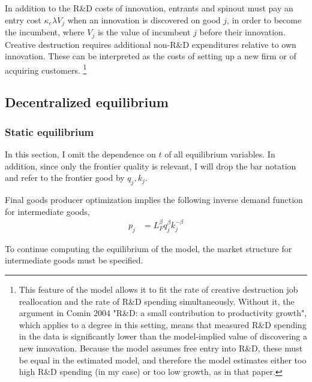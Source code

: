 \documentclass[11pt,english]{article}
\theoremstyle{remark}
\begin{document}
In addition to the R\&D costs of innovation, entrants and spinout must pay an entry cost $\kappa_{e} \lambda V_{j}$ when an innovation is discovered on good $j$, in order to become the incumbent, where $V_{j}$ is the value of incumbent $j$ before their innovation. Creative destruction requires additional non-R\&D expenditures relative to own innovation. These can be interpreted as the costs of setting up a new firm or of acquiring customers. \footnote{This feature of the model allows it to fit the rate of creative destruction job reallocation and the rate of R\&D spending simultaneously. Without it, the argument in Comin 2004 "R\&D: a small contribution to productivity growth", which applies to a degree in this setting, means that measured R\&D spending in the data is significantly lower than the model-implied value of discovering a new innovation. Because the model assumes free entry into R\&D, these must be equal in the estimated model, and therefore the model estimates either too high R\&D spending (in my case) or too low growth, as in that paper.}


\subsection{Decentralized equilibrium}

\subsubsection{Static equilibrium}

In this section, I omit the dependence on $t$ of all equilibrium variables. In addition, since only the frontier quality is relevant, I will drop the bar notation and refer to the frontier good by $q_j, k_j$.

Final goods producer optimization implies the following inverse demand function for intermediate goods, 
\begin{align*}
p_j &= L_F^{\beta} q_j^{\beta} k_j^{-\beta}	
\end{align*}

To continue computing the equilibrium of the model, the market structure for intermediate goods must be specified. 
\end{document}
